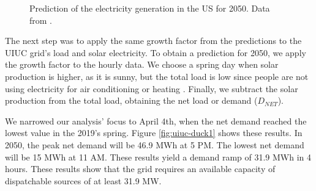 \begin{figure}[htbp!]
    \centering
    \hfill
    \caption{Prediction of the electricity generation in the \gls{US} for 2050. Data from \cite{us_energy_information_administration_electric_2020}.}
    \label{fig:prediction}
\end{figure}

The next step was to apply the same growth factor from the predictions to the \gls{UIUC} grid's load and solar electricity.
To obtain a prediction for 2050, we apply the growth factor to the hourly data.
We choose a spring day when solar production is higher, as it is sunny, but the total load is low since people are not using electricity for air conditioning or heating \cite{us_department_of_energy_confronting_2017}.
Finally, we subtract the solar production from the total load, obtaining the net load or demand ($D_{NET}$).

We narrowed our analysis' focus to April 4th, when the net demand reached the lowest value in the 2019's spring.
Figure \ref{fig:uiuc-duck1} shows these results.
In 2050, the peak net demand will be 46.9 MWh at 5 PM.
The lowest net demand will be 15 MWh at 11 AM.
These results yield a demand ramp of 31.9 MWh in 4 hours.
These results show that the grid requires an available capacity of dispatchable sources of at least 31.9 MW.

